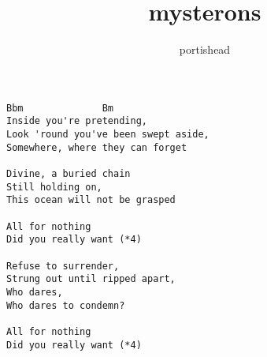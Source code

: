 \author{portishead}
\title{mysterons}
\maketitle
\begin{verbatim}
Bbm              Bm
Inside you're pretending,
Look 'round you've been swept aside,
Somewhere, where they can forget

Divine, a buried chain
Still holding on,
This ocean will not be grasped

All for nothing
Did you really want (*4)

Refuse to surrender,
Strung out until ripped apart,
Who dares,
Who dares to condemn?

All for nothing
Did you really want (*4)
\end{verbatim}